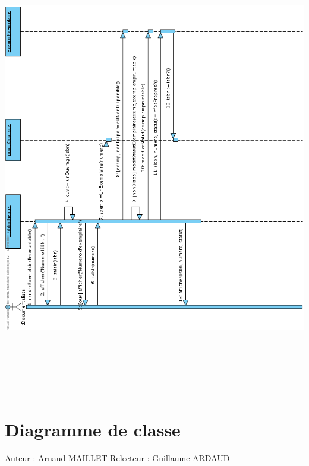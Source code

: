 \documentclass[a4paper,10pt]{report}
\begin{document}
\bigskip
\includegraphics[height=200mm]{RendreExEmpruntableNormal.png}
\newpage

\section*{Diagramme de classe}

Auteur : Arnaud MAILLET
Relecteur : Guillaume ARDAUD

\bigskip
\end{document}
